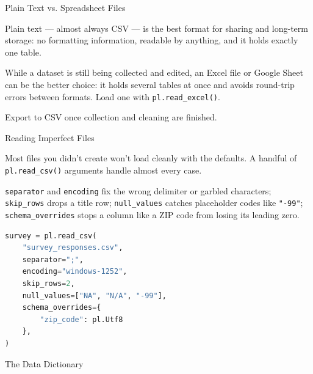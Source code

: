 \documentclass[8pt,aspectratio=169]{beamer}
\begin{document}
\begin{textframe}{Plain Text vs. Spreadsheet Files}

Plain text --- almost always CSV --- is the best format for sharing and long-term storage: no formatting information, readable by anything, and it holds exactly one table.

While a dataset is still being collected and edited, an Excel file or Google Sheet can be the better choice: it holds several tables at once and avoids round-trip errors between formats. Load one with \texttt{pl.read\_excel()}.

Export to CSV once collection and cleaning are finished.

\end{textframe}

\begin{frame}[fragile]{Reading Imperfect Files}
\begin{splitcode}{%

Most files you didn't create won't load cleanly with the defaults. A handful of \texttt{pl.read\_csv()} arguments handle almost every case.

\texttt{separator} and \texttt{encoding} fix the wrong delimiter or garbled characters; \texttt{skip\_rows} drops a title row; \texttt{null\_values} catches placeholder codes like \texttt{"-99"}; \texttt{schema\_overrides} stops a column like a ZIP code from losing its leading zero.

}
\begin{lstlisting}[language=Python]
survey = pl.read_csv(
    "survey_responses.csv",
    separator=";",
    encoding="windows-1252",
    skip_rows=2,
    null_values=["NA", "N/A", "-99"],
    schema_overrides={
        "zip_code": pl.Utf8
    },
)
\end{lstlisting}
\end{splitcode}
\end{frame}

\begin{rightframe}{The Data Dictionary}
\end{rightframe}
\end{document}
